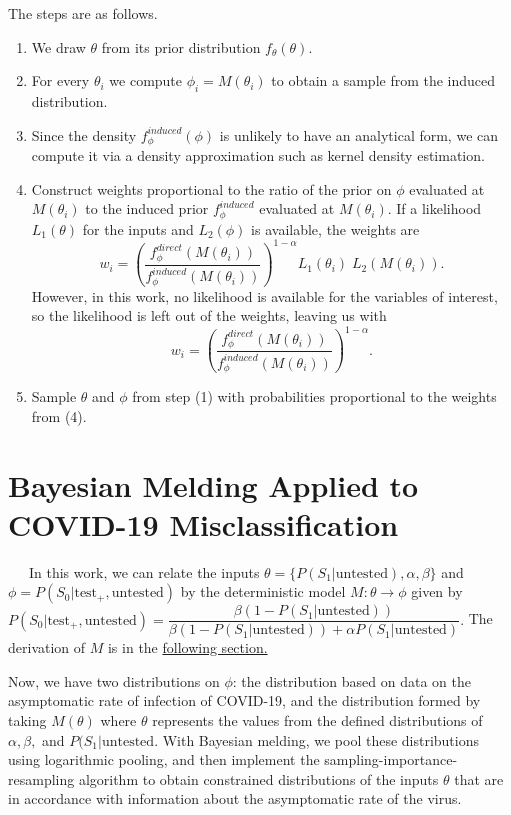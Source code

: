 \documentclass[12pt,twoside]{smiththesis}
\providecommand{\tightlist}{%
  \setlength{\itemsep}{0pt}\setlength{\parskip}{0pt}}
\begin{document}
The steps are as follows.
\begin{enumerate}
\def\labelenumi{\arabic{enumi}.}
\tightlist
\item
  We draw \(\theta\) from its prior distribution \(f_\theta(\theta)\).
\item
  For every \(\theta_i\) we compute \(\phi_i = M(\theta_i)\) to obtain a sample from the induced distribution.
\item
  Since the density \(f_\phi^{induced}(\phi)\) is unlikely to have an analytical form, we can compute it via a density approximation such as kernel density estimation.
\item
  Construct weights proportional to the ratio of the prior on \(\phi\) evaluated at \(M(\theta_i)\) to the induced prior \(f_\phi^{induced}\) evaluated at \(M(\theta_i)\). If a likelihood \(L_1(\theta)\) for the inputs and \(L_2(\phi)\) is available, the weights are
  \[w_i = \left( \frac{f_\phi^{direct}(M(\theta_i))}{f_\phi^{induced}(M(\theta_i))} \right)^{1-\alpha}L_1(\theta_i) \; L_2(M(\theta_i)).\]
  However, in this work, no likelihood is available for the variables of interest, so the likelihood is left out of the weights, leaving us with
  \[w_i = \left( \frac{f_\phi^{direct}(M(\theta_i))}{f_\phi^{induced}(M(\theta_i))} \right)^{1-\alpha}.\]
\item
  Sample \(\theta\) and \(\phi\) from step (1) with probabilities proportional to the weights from (4).
\end{enumerate}
\newpage

\hypertarget{meld}{%
\section{Bayesian Melding Applied to COVID-19 Misclassification}\label{meld}}

~~~In this work, we can relate the inputs \(\theta = \{P(S_1|\text{untested}), \alpha, \beta \}\) and \(\phi = P(S_0|\text{test}_+,\text{untested})\) by the deterministic model \(M: \theta \to \phi\) given by \(P(S_0|\text{test}_+, \text{untested}) = \dfrac{\beta(1 - P(S_1|\text{untested}))}{\beta(1-P(S_1|\text{untested})) + \alpha P(S_1|\text{untested})}.\) The derivation of \(M\) is in the \protect\hyperlink{derivation}{following section.}

Now, we have two distributions on \(\phi\): the distribution based on data on the asymptomatic rate of infection of COVID-19, and the distribution formed by taking \(M(\theta)\) where \(\theta\) represents the values from the defined distributions of \(\alpha,\beta,\) and \(P(S_1|\text{untested}\). With Bayesian melding, we pool these distributions using logarithmic pooling, and then implement the sampling-importance-resampling algorithm to obtain constrained distributions of the inputs \(\theta\) that are in accordance with information about the asymptomatic rate of the virus.
\end{document}
